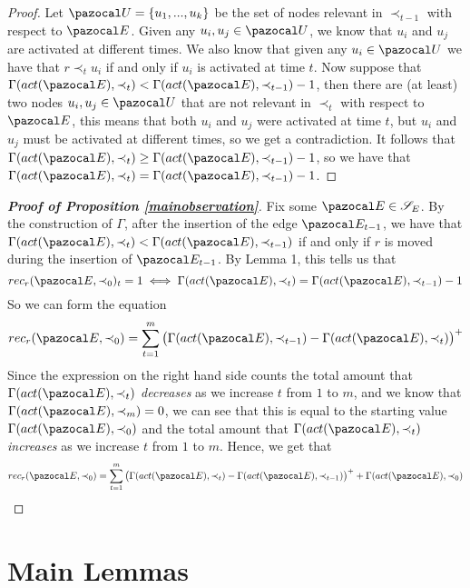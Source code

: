 \documentclass{report}
\begin{document}
\begin{proof}
Let $\pazocal U = \{u_1,...,u_k\}$ be the set of nodes relevant in $\prec_{t-1}$ with respect to $\pazocal E$. Given any $u_i,u_j \in \pazocal U$, we know that $u_i$ and $u_j$ are activated at different times. We also know that given any $u_i \in \pazocal U$ we have that $r \prec_t u_i$ if and only if $u_i$ is activated at time $t$. Now suppose that $\Gamma(act(\pazocal E), \prec_{t}) < \Gamma(act(\pazocal E), \prec_{t-1}) - 1$, then there are (at least) two nodes $u_i, u_j \in \pazocal U$ that are not relevant in $\prec_t$ with respect to $\pazocal E$, this means that both $u_i$ and $u_j$ were activated at time $t$, but $u_i$ and $u_j$ must be activated at different times, so we get a contradiction. It follows that $\Gamma(act(\pazocal E), \prec_{t}) \geq \Gamma(act(\pazocal E), \prec_{t-1}) - 1$, so we have that $\Gamma(act(\pazocal E), \prec_{t}) = \Gamma(act(\pazocal E), \prec_{t-1}) - 1$.
\end{proof}

\begin{proof}[\textbf{Proof of Proposition \ref{mainobservation}}]
Fix some $\pazocal E \in \mathcal S_E$. By the construction of $\Gamma$, after the insertion of the edge $\pazocal E_{t-1}$, we have that $\Gamma(act(\pazocal E), \prec_{t}) < \Gamma(act(\pazocal E), \prec_{t-1})$ if and only if $r$ is moved during the insertion of $\pazocal E_{t-1}$. By Lemma 1, this tells us that
\[ rec_r(\pazocal E, \prec_{0})_t = 1 \iff \Gamma(act(\pazocal E), \prec_{t}) = \Gamma(act(\pazocal E), \prec_{t-1}) - 1 \]
So we can form the equation
\[ rec_r(\pazocal E, \prec_0) =  \sum_{t=1}^{m}\big(\Gamma(act(\pazocal E), \prec_{t-1}) - \Gamma(act(\pazocal E), \prec_{t})\big)^+ \]
Since the expression on the right hand side counts the total amount that $\Gamma(act(\pazocal E), \prec_{t})$ \textit{decreases} as we increase $t$ from $1$ to $m$, and we know that $\Gamma(act(\pazocal E), \prec_{m}) = 0$, we can see that this is equal to the starting value $\Gamma(act(\pazocal E), \prec_0)$ and the total amount that $\Gamma(act(\pazocal E), \prec_{t})$ \textit{increases} as we increase $t$ from $1$ to $m$. Hence, we get that
\[ rec_r(\pazocal E, \prec_0) =  \sum_{t=1}^{m}\big(\Gamma(act(\pazocal E), \prec_{t}) - \Gamma(act(\pazocal E), \prec_{t-1})\big)^+ + \Gamma(act(\pazocal E), \prec_0) \]
\end{proof}

\section{Main Lemmas}
\end{document}
